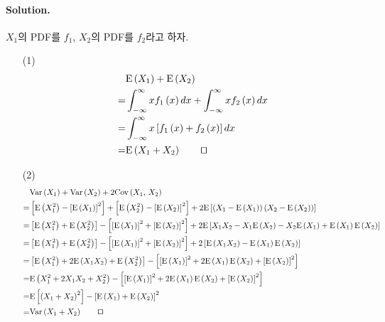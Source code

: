 \paragraph{Solution.} $X_1$의 PDF를 $f_1$, $X_2$의 PDF를 $f_2$라고 하자.

\begin{itemize}
	\item [(1)] {
		\begin{align*}
			& \mathrm{E}\left(X_1\right) + \mathrm{E}\left(X_2\right) \\
			=& \int_{-\infty}^\infty xf_1\left(x\right) dx + \int_{-\infty}^\infty xf_2\left(x\right) dx \\
			=& \int_{-\infty}^\infty x\left[f_1\left(x\right) + f_2\left(x\right)\right] dx \\
			=& \mathrm{E}\left(X_1 + X_2\right) \qquad \qed
		\end{align*}
	}
	\item [(2)] {
		\begin{align*}
			& \mathrm{Var}\left(X_1\right) + \mathrm{Var}\left(X_2\right) + 2\mathrm{Cov}\left(X_1,\,X_2\right) \\
			=& \left[\mathrm{E}\left(X_1^2\right) - \left[\mathrm{E}\left(X_1\right)\right]^2\right] + \left[\mathrm{E}\left(X_2^2\right) - \left[\mathrm{E}\left(X_2\right)\right]^2\right] + 2\mathrm{E}\left[\left(X_1-\mathrm{E}\left(X_1\right)\right)\left(X_2-\mathrm{E}\left(X_2\right)\right)\right] \\
			=& \left[\mathrm{E}\left(X_1^2\right) + \mathrm{E}\left(X_2^2\right)\right] - \left[\left[\mathrm{E}\left(X_1\right)\right]^2 + \left[\mathrm{E}\left(X_2\right)\right]^2\right] + 2\mathrm{E}\left[X_1X_2  - X_1\mathrm{E}\left(X_2\right) - X_2\mathrm{E}\left(X_1\right) + \mathrm{E}\left(X_1\right)\mathrm{E}\left(X_2\right)\right] \\
			=& \left[\mathrm{E}\left(X_1^2\right) + \mathrm{E}\left(X_2^2\right)\right] - \left[\left[\mathrm{E}\left(X_1\right)\right]^2 + \left[\mathrm{E}\left(X_2\right)\right]^2\right] + 2\left[\mathrm{E}\left(X_1X_2\right) - \mathrm{E}\left(X_1\right)\mathrm{E}\left(X_2\right)\right] \\
			=& \left[\mathrm{E}\left(X_1^2\right) + 2\mathrm{E}\left(X_1X_2\right) + \mathrm{E}\left(X_2^2\right)\right] - \left[\left[\mathrm{E}\left(X_1\right)\right]^2 + 2\mathrm{E}\left(X_1\right)\mathrm{E}\left(X_2\right) + \left[\mathrm{E}\left(X_2\right)\right]^2\right] \\
			=& \mathrm{E}\left(X_1^2 + 2X_1X_2 + X_2^2\right) - \left[\left[\mathrm{E}\left(X_1\right)\right]^2 + 2\mathrm{E}\left(X_1\right)\mathrm{E}\left(X_2\right) + \left[\mathrm{E}\left(X_2\right)\right]^2\right] \\
			=& \mathrm{E}\left[\left(X_1+X_2\right)^2\right] - \left[\mathrm{E}\left(X_1\right) + \mathrm{E}\left(X_2\right)\right]^2 \\
			=& \mathrm{Var}\left(X_1 + X_2\right) \qquad \qed
		\end{align*}
	}
\end{itemize}

